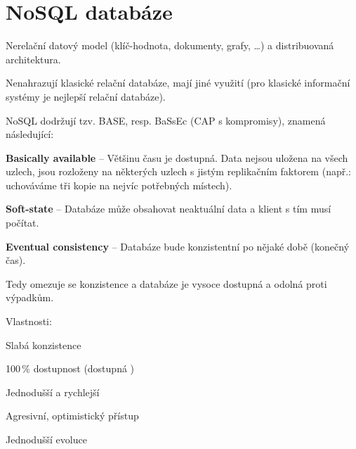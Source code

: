 
\section{NoSQL databáze}

\begin{compactitem}
    \item Nerelační datový model (klíč-hodnota, dokumenty, grafy, \dots) a distribuovaná architektura.

    \item Nenahrazují klasické relační databáze, mají jiné využití (pro klasické informační systémy je nejlepší relační databáze).

    \item NoSQL dodržují tzv. BASE, resp. BaSsEc (CAP s kompromisy), znamená následující: \begin{compactitem}
        \item \textbf{Basically available} -- Většinu času je dostupná. Data nejsou uložena na všech uzlech, jsou rozloženy na některých uzlech s jistým replikačním faktorem (např.: uchováváme tři kopie na nejvíc potřebných místech).

        \item \textbf{Soft-state} -- Databáze může obsahovat neaktuální data a klient s tím musí počítat.

        \item \textbf{Eventual consistency} -- Databáze bude konzistentní po nějaké době (konečný čas).
    \end{compactitem}

    \item Tedy omezuje se konzistence a databáze je vysoce dostupná a odolná proti výpadkům.

    \item Vlastnosti: \begin{compactitem}
        \item Slabá konzistence
        \item 100\,\% dostupnost (dostupná )
        \item Jednodušší a rychlejší
        \item Agresivní, optimistický přístup
        \item Jednodušší evoluce
    \end{compactitem}


\end{compactitem}
